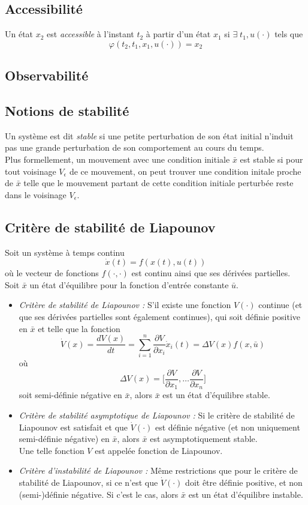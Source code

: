 \documentclass[a4paper]{article}
\begin{document}
\subsection{Accessibilité}
Un état $x_2$ est \emph{accessible} à l'instant $t_2$ à partir d'un état $x_1$
si $\exists\;t_1, u(\cdot)$ tels que \[\varphi(t_2,t_1,x_1,u(\cdot))=x_2\]
\subsection{Observabilité}
\subsection{Notions de stabilité}
Un système est dit  \emph{stable} si une petite perturbation de son état initial
n'induit pas une grande perturbation de son comportement au cours du temps.\\
Plus formellement, un mouvement avec une condition initiale $\bar x$ est
stable si pour tout voisinage $V_\epsilon$ de ce mouvement, on peut trouver
une condition initale proche de $\bar x$ telle que le mouvement partant de
cette condition initiale perturbée reste dans le voisinage $V_\epsilon$.
\subsection{Critère de stabilité de Liapounov}
Soit un système à temps continu
\[\dot x(t)=f(x(t),u(t))\]
où le vecteur de fonctions $f(\cdot, \cdot)$ est continu ainsi que ses
dérivées partielles.\\
Soit $\bar x$ un état d'équilibre pour la fonction d'entrée constante $\bar u$.
\begin{itemize}
	\item \emph{Critère de stabilité de Liapounov :} S'il existe une fonction
		$V(\cdot)$ continue (et que ses dérivées partielles sont également
		continues), qui soit définie positive en $\bar x$ et telle que la
		fonction
		\[
			\dot V(x)=\frac{dV(x)}{dt}
			=\sum_{i=1}^{n}\frac{\partial V}{\partial x_i}\dot x_i(t)
			=\Delta V(x)f(x,\bar u)\]
		où
		\[\Delta V(x)=\big[\frac{\partial V}{\partial x_1},\dots
		\frac{\partial V}{\partial x_n}\big]\]
		soit semi-définie négative en $\bar x$, alors $\bar x$ est un état
		d'équilibre stable.
	\item \emph{Critère de stabilité asymptotique de Liapounov :}
		Si le critère de stabilité de Liapounov est satisfait et que
		$\dot V(\cdot)$ est définie négative (et non uniquement semi-définie
		négative) en $\bar x$, alors $\bar x$ est asymptotiquement stable.\\
		Une telle fonction \(V\) est appelée fonction de Liapounov.
	\item \emph{Critère d'instabilité de Liapounov :} Même restrictions
		que pour le critère de stabilité de Liapounov, si ce n'est que
		$\dot V(\cdot)$ doit être définie positive, et non
		(semi-)définie négative. Si c'est le cas, alors \(\bar x\) est
		un état d'équilibre instable.
\end{itemize}
\end{document}
